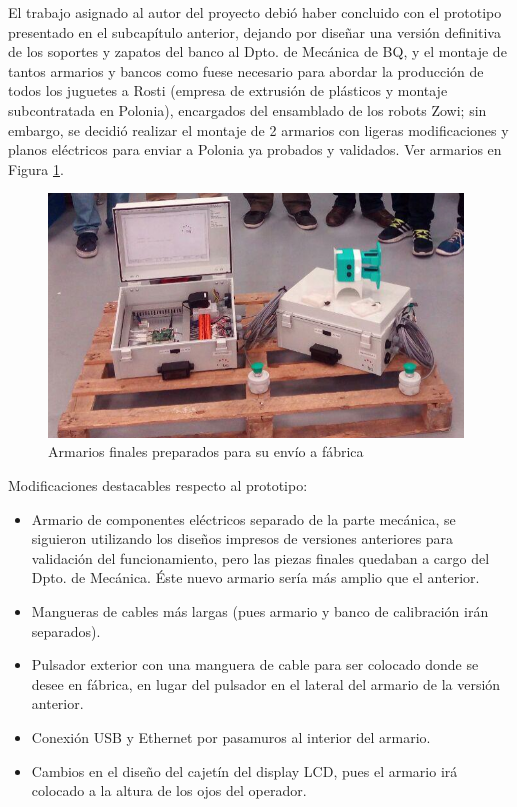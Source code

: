 El trabajo asignado al autor del proyecto debió haber concluido con el prototipo presentado en el subcapítulo anterior, dejando por diseñar una versión definitiva de los soportes y zapatos del banco al Dpto. de Mecánica de BQ, y el montaje de tantos armarios y bancos como fuese necesario para abordar la producción de todos los juguetes a Rosti (empresa de extrusión de plásticos y montaje subcontratada en Polonia), encargados del ensamblado de los robots Zowi; sin embargo, se decidió realizar el montaje de 2 armarios con ligeras modificaciones y planos eléctricos para enviar a Polonia ya probados y validados. Ver armarios en Figura \ref{fig:armariosFinales}.

\begin{figure}
\centering
\includegraphics[width=110mm]{Figures/armariosFinales}
\caption{Armarios finales preparados para su envío a fábrica}
\label{fig:armariosFinales}
\end{figure}

Modificaciones destacables respecto al prototipo:
\begin{itemize}
  \item Armario de componentes eléctricos separado de la parte mecánica, se siguieron utilizando los diseños impresos de versiones anteriores para validación del funcionamiento, pero las piezas finales quedaban a cargo del Dpto. de Mecánica. Éste nuevo armario sería más amplio que el anterior.
  \item Mangueras de cables más largas (pues armario y banco de calibración irán separados).
  \item Pulsador exterior con una manguera de cable para ser colocado donde se desee en fábrica, en lugar del pulsador en el lateral del armario de la versión anterior.
  \item Conexión USB y Ethernet por pasamuros al interior del armario.
  \item Cambios en el diseño del cajetín del display LCD, pues el armario irá colocado a la altura de los ojos del operador.
\end{itemize}

